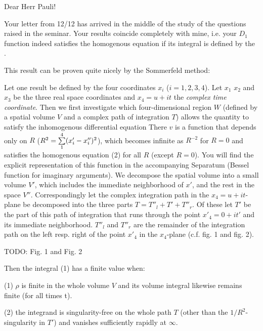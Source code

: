 \date{December 17, 1939}

\nc{\vtint}{\int\int\int\int}

Dear Herr Pauli!

Your letter from 12/12 has arrived in the middle of the study of the questions raised in the seminar. Your results coincide completely with mine, i.e. your $D_1$ function indeed satisfies the homogenous equation if its integral is defined by the .

This result can be proven quite nicely by the Sommerfeld method: 

Let one result be defined by the four coordinates $x_i$ ($i=1,2,3,4$).  Let $x_1$ $x_2$ and $x_3$ be the three real space coordinates and $x_4 = u + it$ the \textit{complex time coordinate}. Then we first investigate which four-dimensional region $W$ (defined by a spatial volume $V$ and a complex path of integration $T$) allows the quantity
to satisfy the inhomogenous differential equation
There $v$ is a function that depends only on $R$ ($R^2 = \underset{1}{\overset{4}{\sum}}(x'_i - x''_i)^2$), which becomes infinite as $R^{-2}$ for $R=0$ and satisfies the homogenous equation (2) for all $R$ (except $R=0$). You will find the explicit representation of this function in the accompanying Separatum (Bessel function for imaginary arguments). We decompose the spatial volume into a small volume $V'$, which includes the immediate neighborhood of $x'$, and the rest in the space $V''$. Correspondingly let the complex integration path in the $x_4=u+it$-plane be decomposed into the three parts $T=T''_l + T' + T''_r$. Of these let $T'$ be the part of this path of integration that runs through the point $x'_4 = 0+it'$ and its immediate neighborhood. $T''_l$ and $T''_r$ are the remainder of the integration path on the left resp. right of the point $x'_4$ in the $x_4$-plane (c.f. fig. 1 and fig. 2).

TODO: Fig. 1 and Fig. 2

Then the integral (1) has a finite value when:

(1) $\rho$ is finite in the whole volume $V$ and its volume integral likewise remains finite (for all times t).

(2) the integrand is singularity-free on the whole path $T$ (other than the $1/R^2$-singularity in $T'$) and vanishes sufficiently rapidly at $\infty$.


